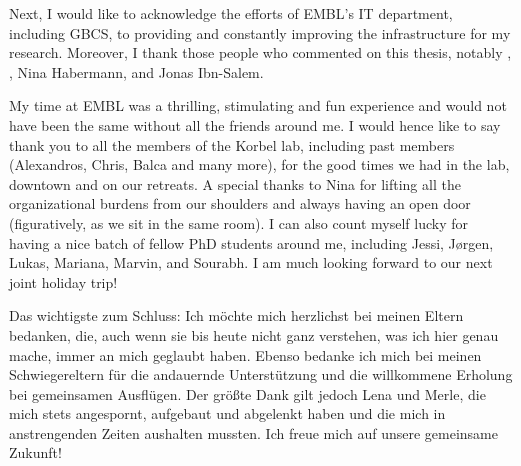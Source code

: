 Next, I would like to acknowledge the efforts of EMBL's IT department, including
GBCS, to providing and constantly improving the infrastructure for my research.
Moreover, I thank those people who commented on this thesis, notably \jan,
\ashley, Nina Habermann, \alek and Jonas Ibn-Salem.

My time at EMBL was a thrilling, stimulating and fun experience and would not
have been the same without all the friends around me. I would hence like to say
thank you to all the members of the Korbel lab, including past members (Alexandros,
Chris, Balca and many more), for the good times we had in the lab, downtown and
on our retreats. A special thanks to Nina for lifting all the organizational
burdens from our shoulders and always having an open door (figuratively, as we
sit in the same room). I can also count myself lucky for having a nice batch of
fellow PhD students around me, including Jessi, Jørgen, Lukas, Mariana, Marvin,
and Sourabh. I am much looking forward to our next joint holiday trip!

Das wichtigste zum Schluss: Ich möchte mich herzlichst bei meinen Eltern
bedanken, die, auch wenn sie bis heute nicht ganz verstehen, was ich hier genau
mache, immer an mich geglaubt haben. Ebenso bedanke ich mich bei meinen
Schwiegereltern für die andauernde Unterstützung und die willkommene Erholung
bei gemeinsamen Ausflügen. Der größte Dank gilt jedoch Lena und Merle, die mich
stets angespornt, aufgebaut und abgelenkt haben und die mich in anstrengenden
Zeiten aushalten mussten. Ich freue mich auf unsere gemeinsame Zukunft!
